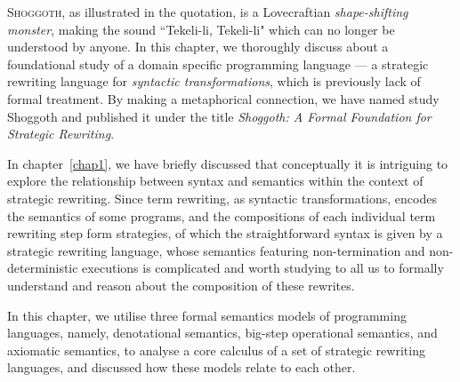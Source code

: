 \noindent
\begin{center}
\vspace{0.3em}
\vspace{-0.7em}
\end{center}
\lettrine{S}{hoggoth}, as illustrated in the quotation, is a Lovecraftian \emph{shape-shifting monster}, making the sound ``Tekeli-li, Tekeli-li" which can no longer be understood by anyone. In this chapter, we thoroughly discuss about a foundational study of a domain specific programming language --- a strategic rewriting language for \emph{syntactic transformations}, which is previously lack of formal treatment. By making a metaphorical connection, we have named study Shoggoth and published it under the title \emph{Shoggoth: A Formal Foundation for Strategic Rewriting}. 

In chapter~\ref{chap1}, we have briefly discussed that conceptually it is intriguing to explore the relationship between syntax and semantics within the context of strategic rewriting. Since term rewriting, as syntactic transformations, encodes the semantics of some programs, and the compositions of each individual term rewriting step form strategies, of which the straightforward syntax is given by a strategic rewriting language, whose semantics featuring non-termination and non-deterministic executions is complicated and worth studying to all us to formally understand and reason about the composition of these rewrites.

In this chapter, we utilise three formal semantics models of programming languages, namely, denotational semantics, big-step operational semantics, and axiomatic semantics, to analyse a core calculus of a set of strategic rewriting languages, and discussed how these models relate to each other.

